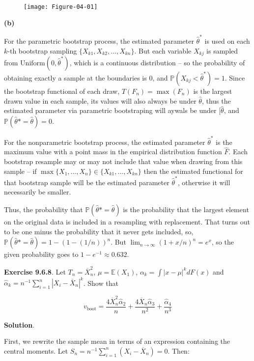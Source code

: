 \begin{figure}[H]
\centering
\texttt{[image: Figure-04-01]}
\end{figure}

\textbf{(b)}

For the parametric bootstrap process, the estimated parameter
\(\hat{\theta}^*\) is used on each \(k\)-th bootstrap sampling
\(\{ X_{k1}, X_{k2}, \dots, X_{kn} \}\). But each variable \(X_{kj}\) is
sampled from \(\text{Uniform}(0, \hat{\theta}^*)\), which is a
continuous distribution -- so the probability of obtaining exactly a
sample at the boundaries is 0, and
\(\mathbb{P}(X_{kj} < \hat{\theta}^*) = 1\). Since the bootstrap
functional of each draw, \(T(F_{n}) = \max(F_{n})\) is the largest drawn
value in each sample, its values will also always be under
\(\hat{\theta}\), thus the estimated parameter via parametric
bootstraping will aywals be under \([\hat{\theta}\), and
\(\mathbb{P}(\hat{\theta}* = \hat{\theta}) = 0\).

For the nonparametric bootstrap process, the estimated parameter
\(\hat{\theta}^*\) is the maximum value with a point mass in the
empirical distribution function \(\hat{F}\). Each bootstrap resample may
or may not include that value when drawing from this sample -- if
\(\max\{X_{1}, \dots, X_{n}\} \in \{X_{k1}, \dots, X_{kn} \}\) then the
estimated functional for that bootstrap sample will be the estimated
parameter \(\hat{\theta}^*\), otherwise it will necessarily be smaller.

Thus, the probability that \(\mathbb{P}(\hat{\theta}* = \hat{\theta})\)
is the probability that the largest element on the original data is
included in a resampling with replacement. That turns out to be one
minus the probability that it never gets included, so,
\(\mathbb{P}(\hat{\theta}* = \hat{\theta}) = 1 - (1 - (1/n))^{n}\). But
\(\lim_{n \rightarrow \infty } (1 + x/n)^{n} = e^x\), so the given
probability goes to \(1 - e^{-1} \approx 0.632\).

\textbf{Exercise 9.6.8}. Let \(T_{n} = \overline{X}_{n}^{2}\),
\(\mu = \mathbb{E}(X_{1})\), \(\alpha_{k} = \int |x - \mu|^{k} dF(x)\) and
\(\hat{\alpha}_{k} = n^{-1} \sum_{i=1}^{n} |X_{i} - \overline{X}_{n}|^{k}\). Show
that

\[v_\text{boot} = \frac{4 \overline{X}_{n}^{2} \hat{\alpha}_{2}}{n} + \frac{4 \overline{X}_{n} \hat{\alpha}_{3}}{n^{2}} + \frac{\hat{\alpha}_{4}}{n^{3}}\]

\textbf{Solution}.

First, we rewrite the sample mean in terms of an expression containing
the central moments. Let
\(S_{n} = n^{-1} \sum_{i=1}^{n} (X_{i} - \overline{X}_{n}) = 0\). Then:

